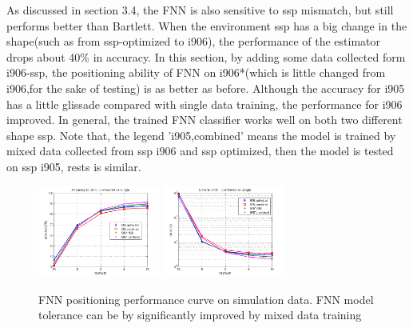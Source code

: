 
As discussed in section 3.4, the FNN is also sensitive to ssp mismatch, but still performs better than Bartlett. When the environment ssp has a big change in the shape(such as from ssp-optimized to i906), the performance of the estimator drops about 40\% in accuracy. In this section, by adding some data collected form i906-ssp, the positioning ability of FNN on i906{*}(which is little changed from i906,for the sake of testing) is as better as before. Although the accuracy for i905 has a little glissade compared with single data training, the performance for i906 improved. In general, the trained FNN classifier works well on both two different shape ssp. Note that, the legend 'i905,combined' means the model is trained by mixed data collected from ssp i906 and ssp optimized, then the model is tested on ssp i905, rests is similar.

\begin{figure}
\includegraphics[width=4cm,height=3cm]{figure/Accuracy_to_SNR_Combined_vs_Single}
\includegraphics[width=4cm,height=3cm]{figure/Error_to_SNR_Combined_vs_Single}
\caption{FNN positioning performance curve on simulation data. FNN model tolerance can be by significantly improved by mixed data training}
\end{figure}

